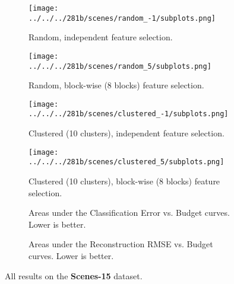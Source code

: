 \begin{figure}[ht!]
    \centering
    \begin{subfigure}[b]{\textwidth}
        \centering
        \texttt{[image: ../../../281b/scenes/random\_-1/subplots.png]}
        \caption{Random, independent feature selection.\vspace{.2cm}}
    \end{subfigure}
    \begin{subfigure}[b]{\textwidth}
        \centering
        \texttt{[image: ../../../281b/scenes/random\_5/subplots.png]}
        \caption{Random, block-wise (8 blocks) feature selection.\vspace{.2cm}}
    \end{subfigure}
    \begin{subfigure}[b]{\textwidth}
        \centering
        \texttt{[image: ../../../281b/scenes/clustered\_-1/subplots.png]}
        \caption{Clustered (10 clusters), independent feature selection.\vspace{.2cm}}
    \end{subfigure}
    \begin{subfigure}[b]{\textwidth}
        \centering
        \texttt{[image: ../../../281b/scenes/clustered\_5/subplots.png]}
        \caption{Clustered (10 clusters), block-wise (8 blocks) feature selection.\vspace{.2cm}}
    \end{subfigure}

    \small{
    \begin{subfigure}[b]{1\textwidth}
        \centering
        
        \caption{Areas under the Classification Error vs. Budget curves. Lower is better.}
    \end{subfigure}
    \begin{subfigure}[b]{1\textwidth}
        \centering
        
        \caption{Areas under the Reconstruction RMSE vs. Budget curves. Lower is better.}
    \end{subfigure}
    }

    \caption{All results on the \textbf{Scenes-15} dataset.}
    \label{fig:scenes}
\end{figure}
